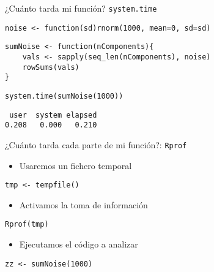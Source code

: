 \documentclass[xcolor={usenames,svgnames,dvipsnames}]{beamer}
\begin{document}
\begin{frame}[fragile,label={sec:orgheadline24}]{¿Cuánto tarda mi función? \texttt{system.time}}
 \lstset{language=R,label= ,caption= ,captionpos=b,numbers=none}
\begin{lstlisting}
noise <- function(sd)rnorm(1000, mean=0, sd=sd)
\end{lstlisting}

\lstset{language=R,label= ,caption= ,captionpos=b,numbers=none}
\begin{lstlisting}
sumNoise <- function(nComponents){
    vals <- sapply(seq_len(nComponents), noise)
    rowSums(vals)
}
\end{lstlisting}

\lstset{language=R,label= ,caption= ,captionpos=b,numbers=none}
\begin{lstlisting}
system.time(sumNoise(1000))
\end{lstlisting}

\begin{verbatim}
 user  system elapsed 
0.208   0.000   0.210
\end{verbatim}
\end{frame}

\begin{frame}[fragile,label={sec:orgheadline25}]{¿Cuánto tarda cada parte de mi función?: \texttt{Rprof}}
 \begin{itemize}
\item Usaremos un fichero temporal
\end{itemize}
\lstset{language=R,label= ,caption= ,captionpos=b,numbers=none}
\begin{lstlisting}
tmp <- tempfile()
\end{lstlisting}

\begin{itemize}
\item Activamos la toma de información
\end{itemize}
\lstset{language=R,label= ,caption= ,captionpos=b,numbers=none}
\begin{lstlisting}
Rprof(tmp)
\end{lstlisting}

\begin{itemize}
\item Ejecutamos el código a analizar
\end{itemize}
\lstset{language=R,label= ,caption= ,captionpos=b,numbers=none}
\begin{lstlisting}
zz <- sumNoise(1000)
\end{lstlisting}
\end{frame}
\end{document}
